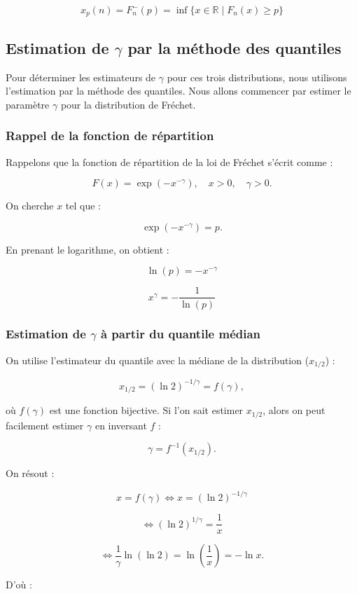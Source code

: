 \documentclass{article}
\begin{document}
\[
x_p(n) = F_n^-(p) = \inf \{ x \in \mathbb{R} \mid F_n(x) \geq p \}
\]

\subsection{Estimation de \(\gamma\) par la méthode des quantiles}

Pour déterminer les estimateurs de \(\gamma\) pour ces trois distributions, nous utilisons l'estimation par la méthode des quantiles.  
Nous allons commencer par estimer le paramètre \(\gamma\) pour la distribution de Fréchet.

\subsubsection{Rappel de la fonction de répartition}

Rappelons que la fonction de répartition de la loi de Fréchet s'écrit comme :

\[
F(x) = \exp(-x^{-\gamma}), \quad x > 0, \quad \gamma > 0.
\]

On cherche \(x\) tel que :

\[
\exp(-x^{-\gamma}) = p.
\]

En prenant le logarithme, on obtient :

\[
\ln(p) = -x^{-\gamma}
\]

\[
x^{\gamma} = -\frac{1}{\ln(p)}
\]

\subsubsection{Estimation de \(\gamma\) à partir du quantile médian}

On utilise l'estimateur du quantile avec la médiane de la distribution (\(x_{1/2}\)) :

\[
x_{1/2} = (\ln 2)^{-1/\gamma} = f(\gamma),
\]

où \(f(\gamma)\) est une fonction bijective.  
Si l'on sait estimer \(x_{1/2}\), alors on peut facilement estimer \(\gamma\) en inversant \(f\) :

\[
\gamma = f^{-1}(x_{1/2}).
\]

On résout :

\[
x = f(\gamma) \iff x = (\ln 2)^{-1/\gamma}
\]

\[
\iff (\ln 2)^{1/\gamma} = \frac{1}{x}
\]

\[
\iff \frac{1}{\gamma} \ln (\ln 2) = \ln \left(\frac{1}{x}\right) = -\ln x.
\]

D'où :
\end{document}
